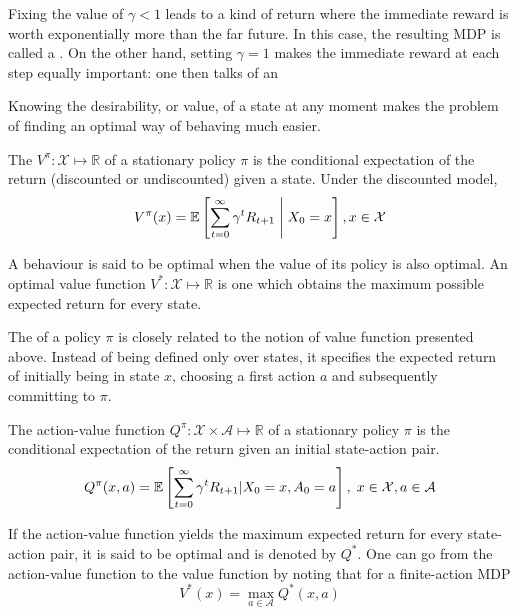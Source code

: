 Fixing the value of $\gamma < 1$ leads to a kind of return where the immediate
reward is worth exponentially more than the far future. In this case, the resulting MDP 
is called a . On the other hand, setting $\gamma =
1$ makes the immediate reward at each step equally important: one 
then talks of an 

Knowing the desirability, or value, of a state at any moment makes the problem of finding an optimal way of behaving much easier.
\begin{defn}
The  $V^\pi: \mathcal{X} \mapsto \mathbb{R}$ of a
stationary policy $\pi$ is the conditional expectation of the return (discounted or
undiscounted) given a state. Under the discounted model, 
\begin{equation} 
V^\pi(x) = \operatorname{\mathbb{E}} \left[ \sum_{t=0}^\infty \gamma^t R_{t+1}  \;\middle\vert\;  X_0 =
x\right] , x \in \mathcal{X} \label{eq:value-function}
\end{equation}
\end{defn}

A behaviour is said to be optimal when the value of its policy is also optimal. An
optimal value function $V^*: \mathcal{X} \mapsto \mathbb{R}$ is one which obtains
the maximum possible expected return for every state.

The  of a policy $\pi$ is closely related to the notion of
value function presented above. Instead of being defined only over states, it specifies
the expected return of initially being in state $x$, choosing a first action $a$ and subsequently committing to $\pi$. 
\begin{defn}
The action-value function $Q^\pi: \mathcal{X} \times \mathcal{A} \mapsto
\mathbb{R}$ of a stationary policy $\pi$ is the conditional expectation of the return
given an initial state-action pair. 
\begin{equation}
Q^\pi(x, a) = \operatorname{\mathbb{E}} \left[ \sum_{t=0}^\infty \gamma^t R_{t+1} \vert X_0 = x,
A_0 = a \right], \; x \in \mathcal{X}, a \in \mathcal{A}
\end{equation}
\end{defn}

If the action-value function yields the maximum expected return for every state-action pair, it is said to be optimal and is denoted by $Q^*$. One can go from the
action-value function to the value function by noting that for a finite-action MDP
\begin{equation}
V^*(x) = \max_{a \in \mathcal{A}} Q^*(x, a) \label{eq:qopt-to-vopt}
\end{equation}

